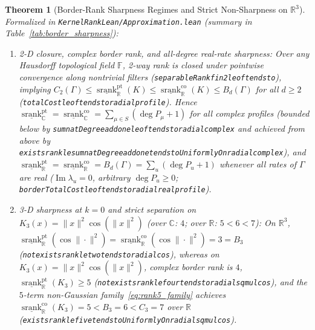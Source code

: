 \documentclass[11pt,a4paper]{article}
\theoremstyle{plain}
\newtheorem{theorem}{Theorem}[section]
\theoremstyle{definition}
\newcommand{\R}{\mathbb{R}}
\newcommand{\C}{\mathbb{C}}
\newcommand{\Field}{\mathbb{F}}
\DeclareMathOperator{\ImPart}{Im}
\DeclareMathOperator{\srank}{srank}
\DeclareRobustCommand{\leanid}[1]{{\def\_{\textunderscore\allowbreak}\texttt{#1}}}
\begin{document}
\begin{theorem}[Border-Rank Sharpness Regimes and Strict Non-Sharpness on $\R^3$]\label{thm:border_exact}
Formalized in \texttt{KernelRankLean/Approximation.lean} (summary in Table~\ref{tab:border_sharpness}):
\begin{enumerate}[leftmargin=2em,itemsep=2pt]
  \item \emph{2-D closure, complex border rank, and all-degree real-rate sharpness:} Over any Hausdorff topological field $\Field$, 2-way rank is closed under pointwise convergence along nontrivial filters (\leanid{separableRank\_fin2\_le\_of\_tendsto}), implying $C_2(\Gamma) \le \underline{\srank}_{\R}^{\mathrm{pt}}(K) \le \underline{\srank}_{\R}^{\mathrm{co}}(K) \le B_d(\Gamma)$ for all $d \ge 2$ (\leanid{totalCost\_le\_of\_tendsto\_radial\_profile}). Hence $\underline{\srank}_{\C}^{\mathrm{pt}} = \underline{\srank}_{\C}^{\mathrm{co}} = \sum_{\mu \in S}(\deg P_\mu + 1)$ for all complex profiles (bounded below by \leanid{sum\_nat\allowbreak Degree\_add\_one\_le\_of\_tendsto\_radial\_complex} and achieved from above by \leanid{exists\_rank\_le\_sum\_nat\allowbreak Degree\_add\_one\_tendsto\allowbreak Uniformly\allowbreak On\_radial\_complex}), and $\underline{\srank}_{\R}^{\mathrm{pt}} = \underline{\srank}_{\R}^{\mathrm{co}} = B_d(\Gamma) = \sum_u (\deg P_u + 1)$ whenever all rates of $\Gamma$ are real ($\ImPart\lambda_u = 0$, arbitrary $\deg P_u \ge 0$; \leanid{border\allowbreak Total\allowbreak Cost\_le\_of\_tendsto\_radial\_real\_profile}).
  \item \emph{3-D sharpness at $k = 0$ and strict separation on $K_3(x) = \|x\|^2\cos(\|x\|^2)$ (over $\C$: $4$; over $\R$: $5 < 6 < 7$):} On $\R^3$, $\underline{\srank}_{\R}^{\mathrm{pt}}(\cos\|\cdot\|^2) = \underline{\srank}_{\R}^{\mathrm{co}}(\cos\|\cdot\|^2) = 3 = B_3$ (\leanid{not\_exists\_rank\_le\_two\_tendsto\_radial\_cos}), whereas on $K_3(x) = \|x\|^2\cos(\|x\|^2)$, complex border rank is $4$, $\underline{\srank}_{\R}^{\mathrm{pt}}(K_3) \ge 5$ (\leanid{not\_exists\_rank\_le\_four\_tendsto\_radial\_sq\_mul\_cos}), and the $5$-term non-Gaussian family~\eqref{eq:rank5_family} achieves $\underline{\srank}_{\R}^{\mathrm{co}}(K_3) = 5 < B_3 = 6 < C_3 = 7$ over $\R$ (\leanid{exists\_rank\_le\_five\_tendsto\allowbreak Uniformly\allowbreak On\_radial\_sq\_mul\_cos}).
\end{enumerate}
\end{theorem}
\end{document}
